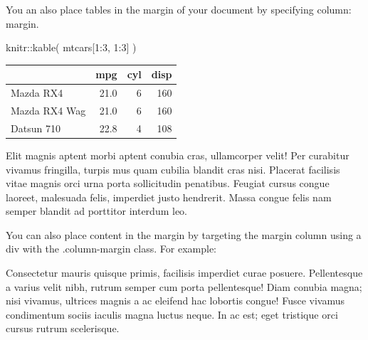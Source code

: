 \documentclass[
  brazilian,
  11pt,
  a4paper,
  open = right,
  twoside = true]{scrbook}
\newenvironment{Shaded}{\begin{snugshade}}{\end{snugshade}}
\newcommand{\DecValTok}[1]{\textcolor[rgb]{0.55,0.29,0.58}{#1}}
\newcommand{\FunctionTok}[1]{\textcolor[rgb]{1.00,0.23,0.00}{#1}}
\newcommand{\NormalTok}[1]{\textcolor[rgb]{0.10,0.10,0.10}{#1}}
\newcommand{\SpecialCharTok}[1]{\textcolor[rgb]{0.85,0.00,0.31}{#1}}
\newcounter{none} %
\begin{document}
You an also place tables in the margin of your document by specifying
column: margin.

\begin{Shaded}
\begin{Highlighting}[numbers=left,,]
\NormalTok{knitr}\SpecialCharTok{::}\FunctionTok{kable}\NormalTok{(}
\NormalTok{  mtcars[}\DecValTok{1}\SpecialCharTok{:}\DecValTok{3}\NormalTok{, }\DecValTok{1}\SpecialCharTok{:}\DecValTok{3}\NormalTok{]}
\NormalTok{)}
\end{Highlighting}
\end{Shaded}

{\def\LTcaptype{none} %
\begin{longtable}[]{@{}lrrr@{}}
\toprule\noalign{}
& mpg & cyl & disp \\
\midrule\noalign{}
\endhead
\bottomrule\noalign{}
\endlastfoot
Mazda RX4 & 21.0 & 6 & 160 \\
Mazda RX4 Wag & 21.0 & 6 & 160 \\
Datsun 710 & 22.8 & 4 & 108 \\
\end{longtable}
}

Elit magnis aptent morbi aptent conubia cras, ullamcorper velit! Per
curabitur vivamus fringilla, turpis mus quam cubilia blandit cras nisi.
Placerat facilisis vitae magnis orci urna porta sollicitudin penatibus.
Feugiat cursus congue laoreet, malesuada felis, imperdiet justo
hendrerit. Massa congue felis nam semper blandit ad porttitor interdum
leo.

You can also place content in the margin by targeting the margin column
using a div with the .column-margin class. For example:


Consectetur mauris quisque primis, facilisis imperdiet curae posuere.
Pellentesque a varius velit nibh, rutrum semper cum porta pellentesque!
Diam conubia magna; nisi vivamus, ultrices magnis a ac eleifend hac
lobortis congue! Fusce vivamus condimentum sociis iaculis magna luctus
neque. In ac est; eget tristique orci cursus rutrum scelerisque.
\end{document}
